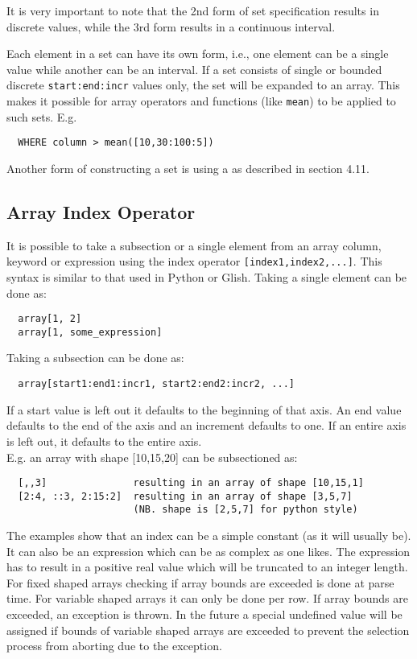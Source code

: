 It is very important to note that the 2nd form of set specification results in
discrete values, while the 3rd form results in a continuous interval.

Each element in a set can have its own form, i.e., one element can
be a single value while another can be an interval.
If a set consists of single or bounded discrete
\texttt{start:end:incr} values only, the set will be expanded to an
array.
This makes it possible for array operators and functions
(like \texttt{mean}) to be applied to such sets. E.g.
\begin{verbatim}
  WHERE column > mean([10,30:100:5])
\end{verbatim}

Another form of constructing a set is using a
 as described in section 4.11.

\subsection{\label{TAQL:INDEXING}Array Index Operator}
It is possible to take a subsection or a
single element from an array column, keyword or expression
using the index operator
\texttt{[index1,index2,...]}. This syntax
is similar to that used in Python or Glish.
Taking a single element can be done as:
\begin{verbatim}
  array[1, 2]
  array[1, some_expression]
\end{verbatim}
Taking a subsection can be done as:
\begin{verbatim}
  array[start1:end1:incr1, start2:end2:incr2, ...]
\end{verbatim}
If a start value is left out it defaults to the beginning of
that axis. An end value defaults to the end of the axis and
an increment defaults to one. If an entire axis is left out,
it defaults to the entire axis.
\\E.g. an array with shape [10,15,20] can be subsectioned as:
\begin{verbatim}
  [,,3]               resulting in an array of shape [10,15,1]
  [2:4, ::3, 2:15:2]  resulting in an array of shape [3,5,7]
                      (NB. shape is [2,5,7] for python style)
\end{verbatim}
The examples show that an index can be a simple constant (as it will
usually be). It can also be an expression which can be as complex
as one likes. The expression has to result in a positive real value
which will be truncated to an integer length.
\\For fixed shaped arrays checking if array bounds are exceeded
is done at parse time.
For variable shaped arrays
it can only be done per row. If array bounds are exceeded,
an exception is thrown. In the future a special undefined value
will be assigned if bounds of variable shaped arrays are exceeded
to prevent the selection process from aborting due to the exception.


